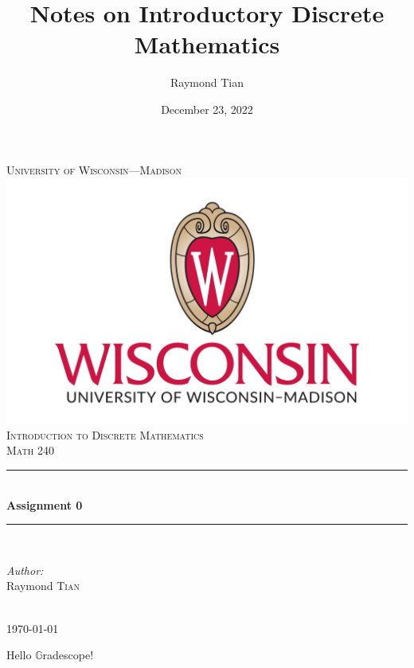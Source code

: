 \documentclass{report}
\title{Notes on Introductory Discrete Mathematics}
\author{Raymond Tian}
\date{December 23, 2022}
\theoremstyle{mytheoremstyle}
\theoremstyle{mytheoremstyle}
\theoremstyle{myproblemstyle}
\begin{document}
\begin{titlepage}
\newcommand{\HRule}{\rule{\linewidth}{0.5mm}}  
\begin{center}
\textsc{\LARGE University of Wisconsin---Madison}\\[1.5cm] 
\includegraphics[scale=.1]{../../images/uw-logo.png}\\[1cm] 
\textsc{\Large Introduction to Discrete Mathematics}\\[0.5cm] 
\textsc{\large Math 240}\\[0.5cm] 

\HRule \\[0.4cm]
{ \huge \bfseries Assignment 0}\\[0.4cm] 
\HRule \\[1.5cm]

\begin{minipage}{0.4\textwidth}
\begin{flushleft} \large
\emph{Author:}\\
Raymond \textsc{Tian}\\ 
\end{flushleft}

\end{minipage}\\[2cm]

{\large \today}\\[2cm] 

\vfill 

\end{center}
\end{titlepage}

\pagestyle{empty}
\newpage
\pagestyle{fancy}
Hello $\mathbb{G}$radescope!
\end{document}
